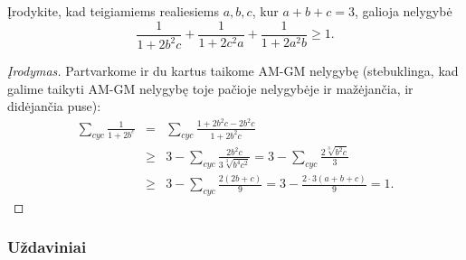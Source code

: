 \begin{pavnr}
  Įrodykite, kad teigiamiems realiesiems $a,b,c$, kur $a+b+c=3$, galioja
  nelygybė $$\frac{1}{1+2b^2c}+\frac{1}{1+2c^2a}+\frac{1}{1+2a^2b}\geq1.$$
\end{pavnr}

\begin{proof}[Įrodymas]
  Partvarkome ir du kartus taikome AM-GM nelygybę (stebuklinga, kad galime
  taikyti AM-GM nelygybę toje pačioje nelygybėje ir mažėjančia, ir didėjančia
  puse):
  \begin{eqnarray*}\sum_{cyc}{\frac{1}{1+2b^c}}&=&\sum_{cyc}{\frac{1+2b^2c-2b^2c}{1+2b^2c}}\\
    &\geq&3-\sum_{cyc}{\frac{2b^2c}{3\sqrt[3]{b^4c^2}}}=3-\sum_{cyc}{\frac{2\sqrt[3]{b^2c}}{3}}\\
    &\geq&3-\sum_{cyc}{\frac{2(2b+c)}{9}}=3-\frac{2\cdot3(a+b+c)}{9}=1.
  \end{eqnarray*}
\end{proof}

\subsubsection{Uždaviniai}

